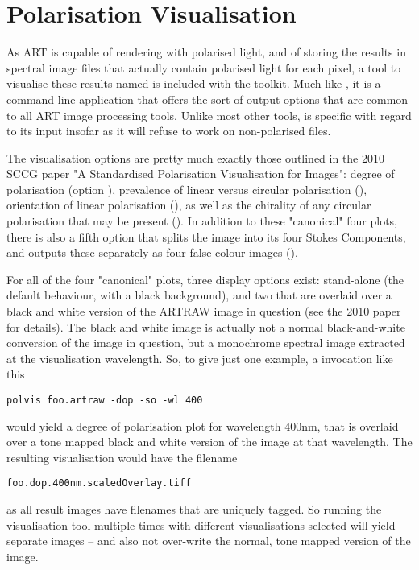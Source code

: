 \section{Polarisation Visualisation}
As ART is capable of rendering with polarised light, and of storing the results in spectral image files that actually contain polarised light for each pixel, a tool to visualise these results named  is included with the toolkit. Much like , it is a command-line application that offers the sort of output options that are common to all ART image processing tools. Unlike most other tools,  is specific with regard to its input insofar as it will refuse to work on non-polarised  files.

The visualisation options are pretty much exactly those outlined in the 2010 SCCG paper "A Standardised Polarisation Visualisation for Images": degree of polarisation (option ), prevalence of linear versus circular polarisation (), orientation of linear polarisation (), as well as the chirality of any circular polarisation that may be present (). In addition to these "canonical" four plots, there is also a fifth option that splits the image into its four Stokes Components, and outputs these separately as four false-colour images ().

For all of the four "canonical" plots, three display options exist: stand-alone (the default behaviour, with a black background), and two that are overlaid over a black and white version of the ARTRAW image in question (see the 2010 paper for details). The black and white image is actually not a normal black-and-white conversion of the image in question, but a monochrome spectral image extracted at the visualisation wavelength. So, to give just one example, a  invocation like this

\begin{verbatim}
polvis foo.artraw -dop -so -wl 400
\end{verbatim}

would yield a degree of polarisation plot for wavelength 400nm, that is overlaid over a tone mapped black and white version of the image at that wavelength. The resulting visualisation would have the filename

\begin{verbatim}
foo.dop.400nm.scaledOverlay.tiff
\end{verbatim}

as all  result images have filenames that are uniquely tagged. So running the visualisation tool multiple times with different visualisations selected will yield separate images -- and also not over-write the normal, tone mapped version of the image.


